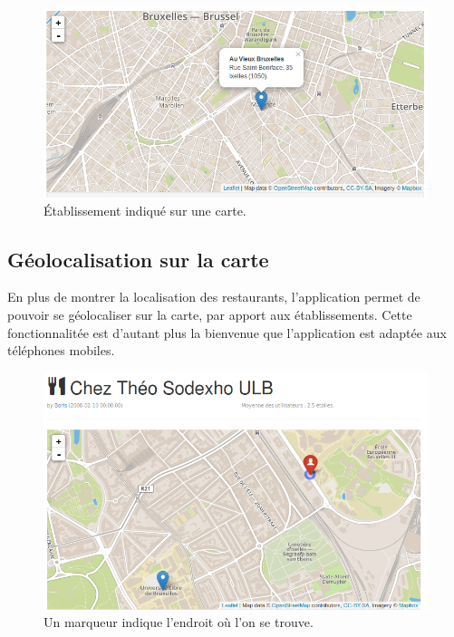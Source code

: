 \documentclass[a4paper,10pt]{article}
\begin{document}
    \begin{figure}[h]
        \centering
        \includegraphics[scale=0.4]{./images/card.png}
        \caption{Établissement indiqué sur une carte.}
    \end{figure}

\subsection{Géolocalisation sur la carte}
    En plus de montrer la localisation des restaurants, l'application permet
    de pouvoir se géolocaliser sur la carte, par apport aux établissements.
    \newline
    Cette fonctionnalitée est d'autant plus la bienvenue que l'application est
    adaptée aux téléphones mobiles.

    \begin{figure}[h]
        \centering
        \includegraphics[scale=0.4]{./images/geolocalisation.png}
        \caption{Un marqueur indique l'endroit où l'on se trouve.}
    \end{figure}
\end{document}
